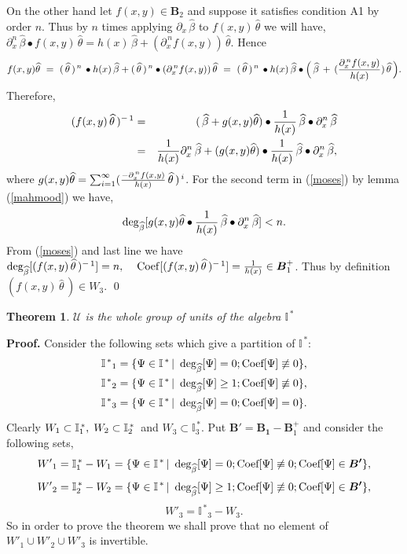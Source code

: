 \documentclass[10pt]{article}
\newcommand{\be}{\begin{equation}}
\newcommand{\ee}{\end{equation}}
\newcommand{\bea}{\begin{eqnarray}}
\newcommand{\eea}{\end{eqnarray}}
\newcommand{\nn}{\nonumber}
\newcommand{\rd}{\partial}
\newcommand{\mIs}{{{\mathbb I}}^{\,*}}
\newcommand{\PP}{\boldsymbol{B}^{+}_1}
\newcommand{\Deg}{\rm deg_{\widehat{\beta}}}
\newcommand{\Cof}{\rm Coef}
\newtheorem{thm}{Theorem}
\begin{document}
{{{On the other hand let $f(x,y)\in \boldsymbol B_2$ and suppose it
satisfies condition A1 by order $n$. Thus by $n$ times applying
$\rd_{x}\,\widehat\beta$
 to $f(x,y)\,\widehat\theta$ we will have,
$\rd_{x}^{n}\,\widehat\beta\bullet
f(x,y)\,\widehat\theta=h(x)\,\widehat\beta+(\rd^{\,n}_{x}f(x,y))\,\widehat\theta
$. Hence \be f(x,y)\widehat\theta\,\, =\,\, (\,\widehat\theta\,)^{\,
n}\,\bullet h(x)\,\widehat\beta+ (\,\widehat\theta\,)^{\, n}\bullet
(\rd^{\,n}_{x}f(x,y))\,\widehat\theta \,\,=\,\,
(\,\widehat\theta\,)^{\, n}\,\bullet h(x)\,\widehat\beta\bullet
\Big(\,\widehat\beta \,+\, ({\rd^{\,n}_{x}f(x,y)\over
h(x)})\,\widehat\theta\,\Big). \nn\ee Therefore,
\bea(f(x,y)\,\widehat\theta\,)^{-\,
1}&=&\,(\,\widehat\beta+g(x,y)\widehat{\theta})\bullet {1\over
h(x)}\,\widehat\beta\bullet\rd_{x}^{n}\,\widehat\beta\nn\\&=&{1\over
h(x)}\rd_{x}^{n}\,\widehat\beta+(g(x,y)\widehat\theta)\bullet
{1\over
h(x)}\,\widehat\beta\bullet\rd_{x}^{n}\,\widehat\beta\label{moses},\eea
where $g(x,y)\widehat{\theta} =\sum^{\infty}_{i=1}
({-\rd^{\,n}_{x}f(x,y)\over h(x)}\,\widehat\theta\,)^{\,i}$. For the
second term in (\ref{moses}) by lemma (\ref{mahmood}) we have,\be
{\rm deg}_{\widehat\beta}[g(x,y)\widehat\theta\bullet {1\over
h(x)}\,\widehat\beta\bullet\rd_{x}^{n}\,\widehat\beta]<n.\label{moses2}\nn\ee
From (\ref{moses}) and last line we have
${\Deg}[(f(x,y)\,\widehat\theta\,)^{-\, 1}]=n, \hspace{0.4cm}
{\Cof}[(f(x,y)\,\widehat\theta\,)^{-\, 1}]={1\over h(x)}\in\PP$.
Thus by definition $(f(x,y)\,\widehat\theta\,)\in W_3$. }\qed\\


\begin{thm}\label{yarali}{ $\mathcal U$ is the whole group of units of the algebra $\mIs$}
\end{thm}

{\bf Proof.} Consider the following sets which give a partition of
$\mIs$:\bea{\mIs}_1=\{\Psi\in \mIs\,|\,\,\, {\rm
deg_{\widehat{\beta}}}[\Psi]=0;{\rm Coef[\Psi]} \not\equiv0 \},\nn\\
{\mIs}_2=\{\Psi\in \mIs\,|\,\,\, {\rm
deg_{\widehat{\beta}}}[\Psi]\ge1;{\rm Coef[\Psi]} \not\equiv0 \},
\nn\\ {\mIs}_3=\{\Psi\in \mIs\,|\,\,\, {\rm
deg_{\widehat{\beta}}}[\Psi]=0; {\rm Coef[\Psi]}=0 \}.\nn\eea
Clearly $ W_1 \subset\mIs_1, \hspace{0.1cm} W_2 \subset\mIs_2\, $
and $W_3 \subset\mIs_3.$ Put
$\boldsymbol{B{'}}=\boldsymbol{{B}_1}-\PP$ and consider the
following sets, \be {W'}_{1}=\mIs_{1}-W_1=\{\Psi\in \mIs\,|\,\,\,
{\rm deg_{\widehat{\beta}}}[\Psi]=0; {\rm Coef[\Psi]} \not\equiv0;
{\rm Coef[\Psi]}\in \boldsymbol{B{'}} \},\nn \ee
\be{W'}_{2}={\mIs_{2}}-W_2=\{\Psi\in \mIs\,|\,\,\, {\rm
deg_{\widehat{\beta}}}[\Psi]\ge1; {\rm Coef[\Psi]} \not\equiv0; {\rm
Coef[\Psi]}\in \boldsymbol{B{'}}\}, \nn\ee \be
{W'}_{3}={\mIs}_3-W_3.\nn\ee So in order to prove the theorem we
shall prove that no element of ${W'}_{1}\cup {W'}_{2} \cup
{W'}_{3}$ is invertible. \\

}}
\end{document}
